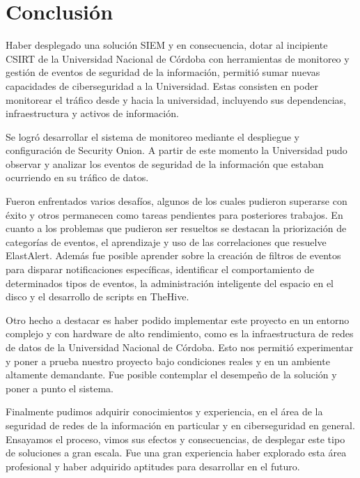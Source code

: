 \chapter{\Large Conclusión}
Haber desplegado una solución SIEM y en consecuencia, dotar al incipiente CSIRT de la Universidad Nacional de Córdoba con herramientas de monitoreo y gestión de eventos de seguridad de la información, permitió sumar nuevas capacidades de ciberseguridad a la Universidad. Estas consisten en poder monitorear el tráfico desde y hacia la universidad, incluyendo sus dependencias, infraestructura y activos de información.
 \par
Se logró desarrollar el sistema de monitoreo mediante el despliegue y configuración de Security Onion. A partir de este momento la Universidad pudo observar y analizar los eventos de seguridad de la información que estaban ocurriendo en su tráfico de datos.  \par
Fueron enfrentados varios desafíos, algunos de los cuales pudieron superarse con éxito y otros permanecen como tareas pendientes para posteriores trabajos. En cuanto a los problemas que pudieron ser resueltos se destacan la priorización de categorías de eventos, el aprendizaje y uso de las correlaciones que resuelve ElastAlert. Además fue posible aprender sobre la creación de filtros de eventos para disparar notificaciones específicas, identificar el comportamiento de determinados tipos de eventos, la administración inteligente del espacio en el disco y el desarrollo de scripts en TheHive. \par

Otro hecho a destacar es haber podido implementar este proyecto en un entorno complejo y con hardware de alto rendimiento, como es la infraestructura de redes de datos de la Universidad Nacional de Córdoba. Esto nos permitió experimentar y poner a prueba nuestro proyecto bajo condiciones reales y en un ambiente altamente demandante. Fue posible contemplar el desempeño de la solución y poner a punto el sistema. \par
Finalmente pudimos adquirir conocimientos y experiencia, en el área de la seguridad de redes de la información en particular y en ciberseguridad en general. Ensayamos el proceso, vimos sus efectos y consecuencias, de desplegar este tipo de soluciones a gran escala. Fue una gran experiencia haber explorado esta área profesional y haber adquirido aptitudes para desarrollar en el futuro. \par


